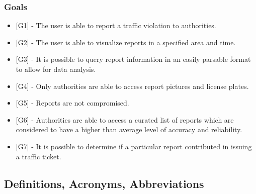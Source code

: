 \newcommand{\goalUserReport}{
    {[G1]} - The user is able to report a traffic violation to authorities.
}
\newcommand{\goalVisualizeReports}{
    {[G2]} - The user is able to visualize reports in a specified area and time.
}
\newcommand{\goalQueryInfo}{
    {[G3]} - It is possible to query report information in an easily parsable format to allow for data analysis.
}
\newcommand{\goalPhotosAuthoritiesOnly}{
    {[G4]} -  Only authorities are able to access report pictures and license plates.
}
\newcommand{\goalCompromisedReports}{
    {[G5]} - Reports are not compromised.
}
\newcommand{\goalCuratedReports}{
    {[G6]} - Authorities are able to access a curated list of reports which are considered to have a higher than average level of accuracy and reliability.
}
\newcommand{\goalTicketAnalysis}{
    {[G7]} - It is possible to determine if a particular report contributed in issuing a traffic ticket.
}
\subsubsection{Goals} \label{sub-sect:goals}
\begin{itemize}[label={}]
\item \goalUserReport{}
\item \goalVisualizeReports{}
\item \goalQueryInfo{}
\item \goalPhotosAuthoritiesOnly{}
\item \goalCompromisedReports{}
\item \goalCuratedReports{}
\item \goalTicketAnalysis{}
\end{itemize}

\subsection{Definitions, Acronyms, Abbreviations}
